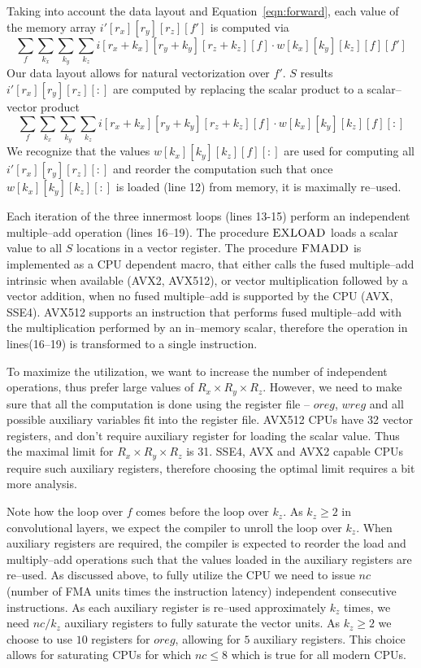   Taking into account the data layout and Equation~\ref{eqn:forward},
  each value of the memory array $i'[r_x][r_y][r_z][f']$ is computed
  via {\footnotesize
  \[
  \sum_{f} \sum_{k_x} \sum_{k_y} \sum_{k_z}
  i[r_x+k_x][r_y+k_y][r_z+k_z][f] \cdot w[k_x][k_y][k_z][f][f']
  \]
  } Our data layout allows for natural vectorization over $f'$.  $S$
  results $i'[r_x][r_y][r_z][:]$ are computed by replacing the scalar
  product to a scalar--vector product {\footnotesize
  \[
  \sum_{f} \sum_{k_x} \sum_{k_y} \sum_{k_z}
  i[r_x+k_x][r_y+k_y][r_z+k_z][f] \cdot w[k_x][k_y][k_z][f][:]
  \]
  } We recognize that the values $w[k_x][k_y][k_z][f][:]$ are used for
  computing all $i'[r_x][r_y][r_z][:]$ and reorder the computation
  such that once $w[k_x][k_y][k_z][:]$ is loaded (line 12) from
  memory, it is maximally re--used.

  Each iteration of the three innermost loops (lines 13-15) perform an
  independent multiple--add operation (lines 16--19).  The procedure
  $\textnormal{\scshape EXLOAD}$ loads a scalar value to all $S$ locations in a
  vector register.  The procedure $\textnormal{\scshape FMADD}$ is implemented as a
  CPU dependent macro, that either calls the fused multiple--add
  intrinsic when available (AVX2, AVX512), or vector multiplication
  followed by a vector addition, when no fused multiple--add is
  supported by the CPU (AVX, SSE4).  AVX512 supports an instruction
  that performs fused multiple--add with the multiplication performed
  by an in--memory scalar, therefore the operation in lines(16--19) is
  transformed to a single instruction.

  To maximize the utilization, we want to increase the number of
  independent operations, thus prefer large values of $R_x \times R_y
  \times R_z$.  However, we need to make sure that all the computation
  is done using the register file -- $oreg$, $wreg$ and all possible
  auxiliary variables fit into the register file.  AVX512 CPUs have 32
  vector registers, and don't require auxiliary register for loading
  the scalar value.  Thus the maximal limit for $R_x \times R_y \times
  R_z$ is 31.  SSE4, AVX and AVX2 capable CPUs require such auxiliary
  registers, therefore choosing the optimal limit requires a bit more
  analysis.

  Note how the loop over $f$ comes before the loop over $k_z$.  As
  $k_z \ge 2$ in convolutional layers, we expect the compiler to
  unroll the loop over $k_z$.  When auxiliary registers are required,
  the compiler is expected to reorder the load and multiply--add
  operations such that the values loaded in the auxiliary registers
  are re--used.  As discussed above, to fully utilize the CPU we need
  to issue $nc$ (number of FMA units times the instruction latency)
  independent consecutive instructions.  As each auxiliary register is
  re--used approximately $k_z$ times, we need $nc/k_z$ auxiliary
  registers to fully saturate the vector units.  As $k_z \ge 2$ we
  choose to use $10$ registers for $oreg$, allowing for $5$ auxiliary
  registers.  This choice allows for saturating CPUs for which $nc \le
  8$ which is true for all modern CPUs.

